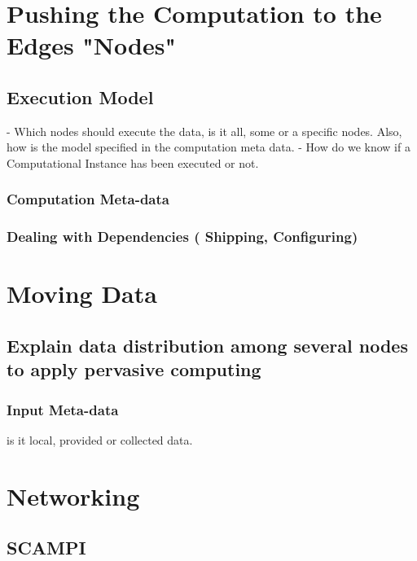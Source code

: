 \section{Pushing the Computation to the Edges "Nodes"}

\subsection{Execution Model}
- Which nodes should execute the data, is it all, some  or a specific nodes. Also, how is the model specified in the computation meta data.
- How do we know if a Computational Instance has been executed or not.
\subsubsection{Computation Meta-data}
\subsubsection{Dealing with Dependencies ( Shipping, Configuring)}


\section{Moving Data}
\subsection{Explain data distribution among several nodes to apply pervasive computing}

\subsubsection{Input Meta-data}
is it local, provided or collected data.

\section{Networking}
\subsection{SCAMPI }







